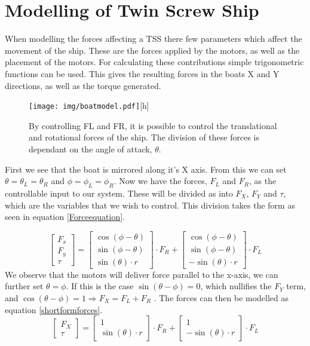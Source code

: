 \chapter{Modelling of Twin Screw Ship}
When modelling the forces affecting a \ac{TSS} there few parameters which affect the movement of the ship. These are the forces applied by the motors, as well as the placement of the motors. For calculating these contributions simple trigonometric functions can be used. This gives the resulting forces in the boats X and Y directions, as well as the torque generated.
\begin{figure}
\texttt{[image: img/boatmodel.pdf]}[h]
\caption{By controlling FL and FR, it is possible to control the translational and rotational forces of the ship. The division of these forces is dependant on the angle of attack, $\theta$.}
\end{figure}
First we see that the boat is mirrored along it's X axis. From this we can set $\theta = \theta_L = \theta_R$ and $\phi = \phi_L = \phi_R$.  Now we have the forces, $F_L$ and $F_R$, as the controllable input to our system. These will be divided as into $F_X$, $F_Y$ and $\tau$, which are the variables that we wish to control. This division takes the form as seen in equation \eqref{Forceequation}.

\begin{equation}
\left[
\begin{matrix}
F_x\\
F_y\\
\tau
\end{matrix}
\right]
 =
 \left[
\begin{matrix}
\cos(\phi - \theta)\\
\sin(\phi - \theta)\\
\sin(\theta) \cdot r
\end{matrix}
\right]
\cdot F_R
+
 \left[
\begin{matrix}
\cos(\phi - \theta)\\
\sin(\phi - \theta)\\
-\sin(\theta) \cdot r
\end{matrix}
\right]
\cdot
F_L
\label{Forceequation}
\end{equation}
We observe that the motors will deliver force parallel to the x-axis, we can further set $\theta = \phi$. If this is the case $\sin(\theta - \phi)=0$, which nullifies the $F_Y$ term, and $\cos(\theta-\phi) = 1 \Longrightarrow F_X = F_L+F_R$ . The forces can then be modelled as equation \eqref{shortformforces}.
\begin{equation}
\left[\begin{matrix}
F_X\\
\tau
\end{matrix}
\right]
= 
\left[
\begin{matrix}
1\\
\sin(\theta)\cdot r
\end{matrix}
\right]
\cdot F_R
+ 
\left[
\begin{matrix}
1\\
-\sin(\theta)\cdot r
\end{matrix}
\right]
\cdot F_L
\label{shortformforces}
\end{equation}

